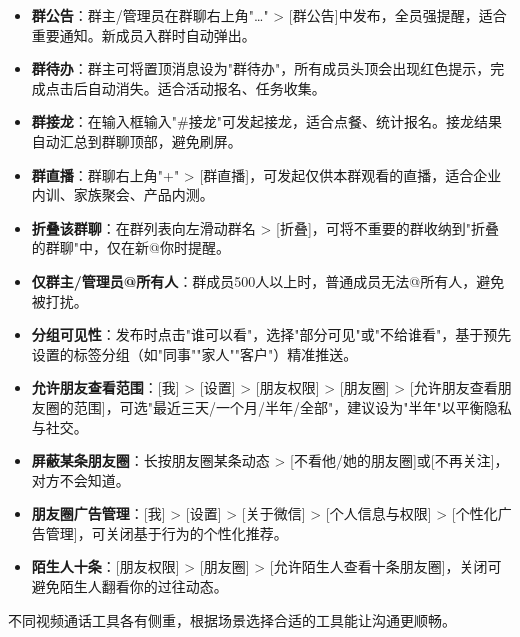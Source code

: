 
\begin{itemize}
  \item \textbf{群公告}：群主/管理员在群聊右上角"…" > [群公告]中发布，全员强提醒，适合重要通知。新成员入群时自动弹出。
  \item \textbf{群待办}：群主可将置顶消息设为"群待办"，所有成员头顶会出现红色提示，完成点击后自动消失。适合活动报名、任务收集。
  \item \textbf{群接龙}：在输入框输入"\#接龙"可发起接龙，适合点餐、统计报名。接龙结果自动汇总到群聊顶部，避免刷屏。
  \item \textbf{群直播}：群聊右上角"+" > [群直播]，可发起仅供本群观看的直播，适合企业内训、家族聚会、产品内测。
  \item \textbf{折叠该群聊}：在群列表向左滑动群名 > [折叠]，可将不重要的群收纳到"折叠的群聊"中，仅在新@你时提醒。
  \item \textbf{仅群主/管理员@所有人}：群成员500人以上时，普通成员无法@所有人，避免被打扰。
\end{itemize}


\begin{itemize}
  \item \textbf{分组可见性}：发布时点击"谁可以看"，选择"部分可见"或"不给谁看"，基于预先设置的标签分组（如"同事""家人""客户"）精准推送。
  \item \textbf{允许朋友查看范围}：[我] > [设置] > [朋友权限] > [朋友圈] > [允许朋友查看朋友圈的范围]，可选"最近三天/一个月/半年/全部"，建议设为"半年"以平衡隐私与社交。
  \item \textbf{屏蔽某条朋友圈}：长按朋友圈某条动态 > [不看他/她的朋友圈]或[不再关注]，对方不会知道。
  \item \textbf{朋友圈广告管理}：[我] > [设置] > [关于微信] > [个人信息与权限] > [个性化广告管理]，可关闭基于行为的个性化推荐。
  \item \textbf{陌生人十条}：[朋友权限] > [朋友圈] > [允许陌生人查看十条朋友圈]，关闭可避免陌生人翻看你的过往动态。
\end{itemize}


不同视频通话工具各有侧重，根据场景选择合适的工具能让沟通更顺畅。

